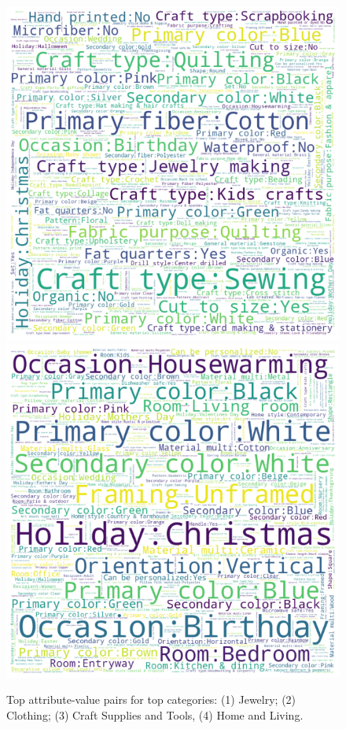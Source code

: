 \documentclass[11pt, dvipdfmx]{article}
\begin{document}
\begin{figure}
    \includegraphics[bb=0 0 110 100]{submissions/in_session_ranking/figs/craft_supplies_and_tools.png}
    \includegraphics[bb=110 0 220 100]{submissions/in_session_ranking/figs/home_and_living.png}
\caption[Word clouds of item attributes in each dataset]{Top attribute-value pairs for top categories: (1) Jewelry; (2) Clothing; (3) Craft Supplies and Tools, (4) Home and Living.}
\label{fig:wordCloud}
\end{figure}
\end{document}
